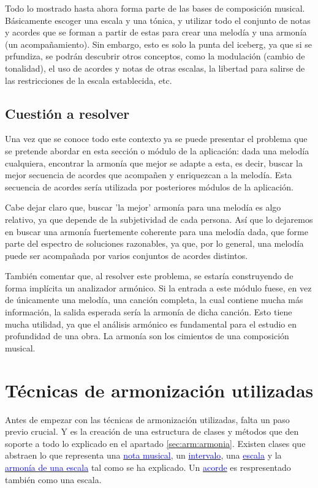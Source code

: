     Todo lo mostrado hasta ahora forma parte de las bases de composición musical. Básicamente escoger una escala y una tónica, y utilizar todo el conjunto de notas y acordes que se forman a partir de estas para crear una melodía y una armonía (un acompañamiento). Sin embargo, esto es solo la punta del iceberg, ya que si se prfundiza, se podrán descubrir otros conceptos, como la modulación (cambio de tonalidad), el uso de acordes y notas de otras escalas, la libertad para salirse de las restricciones de la escala establecida, etc. 

\subsection{Cuestión a resolver}
\label{sec:arm:cuestion}      

    Una vez que se conoce todo este contexto ya se puede presentar el problema que se pretende abordar en esta sección o módulo de la aplicación: dada una melodía cualquiera, encontrar la armonía que mejor se adapte a esta, es decir, buscar la mejor secuencia de acordes que acompañen y enriquezcan a la melodía. Esta secuencia de acordes sería utilizada por posteriores módulos de la aplicación.

    Cabe dejar claro que, buscar 'la mejor' armonía para una melodía es algo relativo, ya que depende de la subjetividad de cada persona. Así que lo dejaremos en buscar una armonía fuertemente coherente para una melodía dada, que forme parte del espectro de soluciones razonables, ya que, por lo general, una melodía puede ser acompañada por varios conjuntos de acordes distintos.

    También comentar que, al resolver este problema, se estaría construyendo de forma implícita un analizador armónico. Si la entrada a este módulo fuese, en vez de únicamente una melodía, una canción completa, la cual contiene mucha más información, la salida esperada sería la armonía de dicha canción. Esto tiene mucha utilidad, ya que el análisis armónico es fundamental para el estudio en profundidad de una obra. La armonía son los cimientos de una composición musical. 

    \section{Técnicas de armonización utilizadas}

    Antes de empezar con las técnicas de armonización utilizadas, falta un paso previo crucial. Y es la creación de una estructura de clases y métodos que den soporte a todo lo explicado en el apartado \ref{sec:arm:armonia}. Existen clases que abstraen lo que representa una \hyperref[arm:notas_musicales]{\textcolor{blue}{nota musical}}, un \hyperref[sec:arm:intervalos]{\textcolor{blue}{intervalo}}, una \hyperref[sec:arm:escalas]{\textcolor{blue}{escala}} y la \hyperref[arm:armonia_escala]{\textcolor{blue}{armonía de una escala}} tal como se ha explicado. Un \hyperref[sec:arm:acordes]{\textcolor{blue}{acorde}} es respresentado también como una escala. 
    
